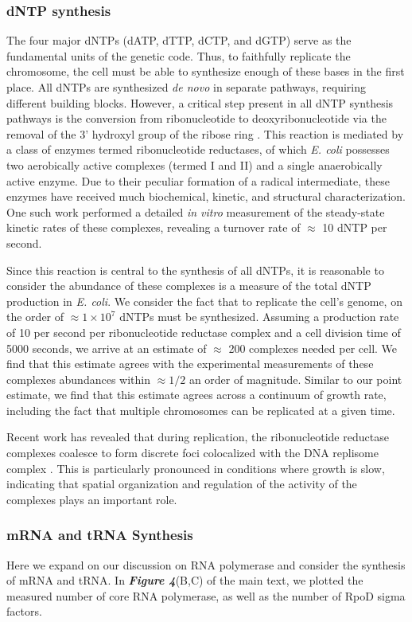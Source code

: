 \subsubsection{dNTP synthesis}
The four major dNTPs (dATP, dTTP, dCTP, and dGTP) serve as the fundamental
units of the genetic code. Thus, to faithfully replicate the chromosome, the
cell must be able to synthesize enough of these bases in the first place. All
dNTPs are synthesized \textit{de novo} in separate pathways, requiring
different building blocks. However, a critical step present in all dNTP
synthesis pathways is the conversion from ribonucleotide to
deoxyribonucleotide via the removal of the 3' hydroxyl group of the ribose
ring \citep{rudd2016}. This reaction is mediated by a class of enzymes termed
ribonucleotide reductases, of which \textit{E. coli} possesses two
aerobically active complexes (termed I and II) and a single anaerobically
active enzyme. Due to their peculiar formation of a radical intermediate,
these enzymes have received much biochemical, kinetic, and structural
characterization. One such work \citep{ge2003} performed a detailed
\textit{in vitro} measurement of the steady-state kinetic rates of these
complexes, revealing a turnover rate of $\approx$ 10 dNTP per second.

Since this reaction is central to the synthesis of all dNTPs, it is reasonable
to consider the abundance of these complexes is a measure of the total dNTP
production in \textit{E. coli}. We consider the fact that to replicate the
cell's genome, on the order of $\approx 1\times 10^{7}$ dNTPs must be
synthesized. Assuming a production rate of 10 per second per ribonucleotide
reductase complex and a cell division time of 5000 seconds, we arrive at an
estimate of $\approx$ 200 complexes needed per cell. We find that this estimate
agrees with the experimental measurements of these complexes abundances within
$\approx 1/2$ an order of magnitude. Similar to our point estimate, we find
that this estimate agrees  across a continuum of growth rate, including the fact
that multiple chromosomes can be replicated at a given time.

Recent work has revealed that during replication, the ribonucleotide
reductase complexes coalesce to form discrete foci colocalized with the DNA
replisome complex \citep{sanchez-romero2011}. This is particularly pronounced
in conditions where growth is slow, indicating that spatial organization and
regulation of the activity of the complexes plays an important role.

\subsubsection{mRNA and tRNA Synthesis}
Here we expand on our discussion on RNA polymerase and consider the synthesis of
mRNA and tRNA. In \textbf{\textit{Figure 4}}(B,C) of the main text, we plotted
the measured  number of core RNA polymerase, as well as the number of RpoD sigma
factors.

